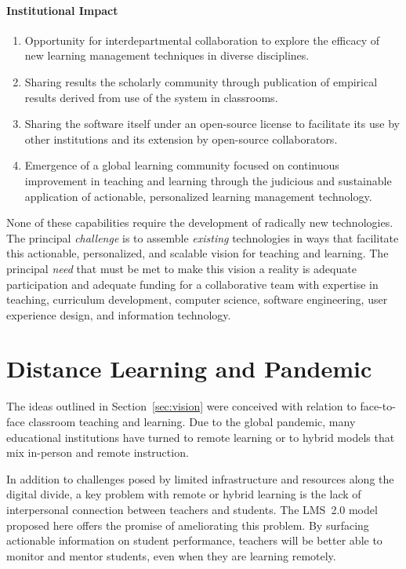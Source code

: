 \documentclass{article}
\begin{document}
\paragraph{Institutional Impact}
\begin{enumerate}
\item
  Opportunity for interdepartmental collaboration
  to explore the efficacy of new learning management techniques
  in diverse disciplines.
\item
  Sharing results the scholarly community
  through publication of empirical results
  derived from use of the system in classrooms.
\item 
  Sharing the software itself
  under an open-source license
  to facilitate its use by other institutions
  and its extension
  by open-source collaborators.
\item
  Emergence of a global learning community
  focused on continuous improvement in teaching and learning
  through the judicious and sustainable application
  of actionable, personalized learning management technology.
\end{enumerate}

None of these capabilities
require the development of radically new technologies.
The principal \emph{challenge}
is to assemble \emph{existing} technologies
in ways that facilitate this actionable, personalized, and scalable vision
for teaching and learning.
The principal \emph{need} that must be met to make this vision a reality
is adequate participation and adequate funding
for a collaborative team with expertise in
teaching, curriculum development,
computer science, software engineering,
user experience design,
and information technology.

\section{Distance Learning and Pandemic}
\label{sec:pandemic}

The ideas outlined in Section~\ref{sec:vision}
were conceived with relation to
face-to-face classroom teaching and learning.
Due to the global pandemic,
many educational institutions
have turned to remote learning
or to hybrid models
that mix in-person and remote instruction.

In addition to challenges posed by limited infrastructure
and resources along the digital divide,
a key problem with remote or hybrid learning
is the lack of interpersonal connection
between teachers and students.
The LMS~2.0 model proposed here
offers the promise of ameliorating
this problem.
By surfacing
actionable information on student performance,
teachers will be better able
to monitor and mentor students,
even when they are learning remotely.
\end{document}
